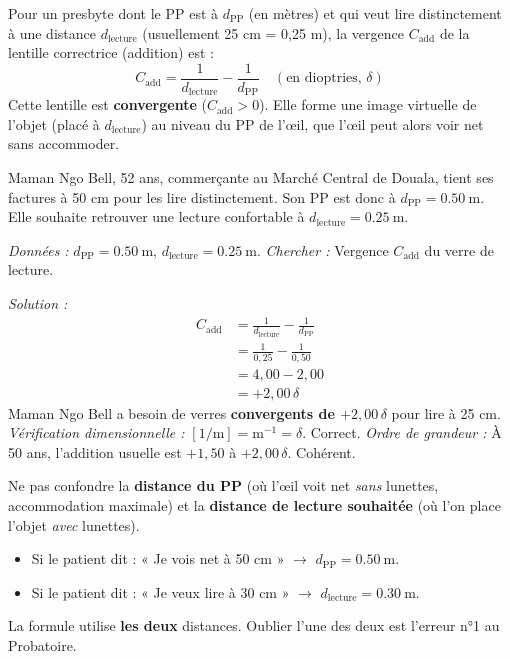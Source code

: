 \documentclass[11pt]{article}
\begin{document}
\begin{propriete}
Pour un presbyte dont le PP est à $d_{\text{PP}}$ (en mètres) et qui veut lire distinctement à une distance $d_{\text{lecture}}$ (usuellement 25 cm = 0,25 m), la vergence $C_{\text{add}}$ de la lentille correctrice (addition) est :
\[
C_{\text{add}} = \frac{1}{d_{\text{lecture}}} - \frac{1}{d_{\text{PP}}} \quad (\text{en dioptries, } \delta)
\]
Cette lentille est \textbf{convergente} ($C_{\text{add}} > 0$). Elle forme une image virtuelle de l'objet (placé à $d_{\text{lecture}}$) au niveau du PP de l'œil, que l'œil peut alors voir net sans accommoder.
\end{propriete}

\begin{exemplebox}
Maman Ngo Bell, 52 ans, commerçante au Marché Central de Douala, tient ses factures à 50 cm pour les lire distinctement. Son PP est donc à $d_{\text{PP}} = \SI{0,50}{\meter}$. Elle souhaite retrouver une lecture confortable à $d_{\text{lecture}} = \SI{0,25}{\meter}$.

\emph{Données :} $d_{\text{PP}} = \SI{0,50}{\meter}$, $d_{\text{lecture}} = \SI{0,25}{\meter}$.
\emph{Chercher :} Vergence $C_{\text{add}}$ du verre de lecture.

\emph{Solution :}
\begin{align*}
C_{\text{add}} &= \frac{1}{d_{\text{lecture}}} - \frac{1}{d_{\text{PP}}} \\
               &= \frac{1}{0,25} - \frac{1}{0,50} \\
               &= 4,00 - 2,00 \\
               &= +2,00\,\delta
\end{align*}
Maman Ngo Bell a besoin de verres \textbf{convergents de $+2,00\,\delta$} pour lire à 25 cm.
\vspace{0,5em}
\emph{Vérification dimensionnelle :} $[1/\text{m}] = \text{m}^{-1} = \delta$. Correct.
\emph{Ordre de grandeur :} À 50 ans, l'addition usuelle est $+1,50$ à $+2,00\,\delta$. Cohérent.
\end{exemplebox}

\begin{attention}
Ne pas confondre la \textbf{distance du PP} (où l'œil voit net \emph{sans} lunettes, accommodation maximale) et la \textbf{distance de lecture souhaitée} (où l'on place l'objet \emph{avec} lunettes).
\begin{itemize}
    \item Si le patient dit : « Je vois net à 50 cm » $\rightarrow$ $d_{\text{PP}} = \SI{0,50}{\meter}$.
    \item Si le patient dit : « Je veux lire à 30 cm » $\rightarrow$ $d_{\text{lecture}} = \SI{0,30}{\meter}$.
\end{itemize}
La formule utilise \textbf{les deux} distances. Oublier l'une des deux est l'erreur n°1 au Probatoire.
\end{attention}
\end{document}
